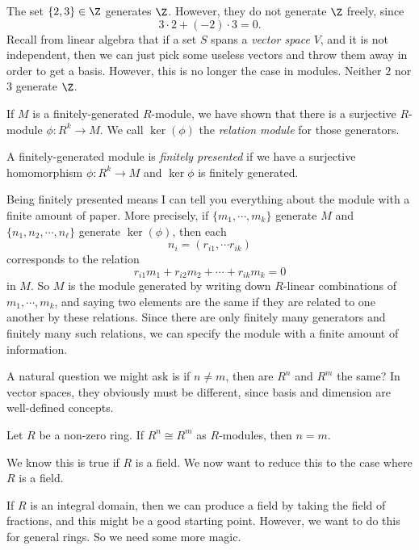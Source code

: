 \documentclass[a4paper]{article}
\begin{document}
\begin{eg}
  The set $\{2, 3\} \in \Z$ generates $\Z$. However, they do not generate $\Z$ freely, since
  \[
    3\cdot 2 + (-2) \cdot 3 = 0.
  \]
  Recall from linear algebra that if a set $S$ spans a \emph{vector space} $V$, and it is not independent, then we can just pick some useless vectors and throw them away in order to get a basis. However, this is no longer the case in modules. Neither $2$ nor $3$ generate $\Z$.
\end{eg}

\begin{defi}[Relations]
  If $M$ is a finitely-generated $R$-module, we have shown that there is a surjective $R$-module $\phi: R^k \to M$. We call $\ker(\phi)$ the \emph{relation module} for those generators.
\end{defi}

\begin{defi}
  A finitely-generated module is \emph{finitely presented} if we have a surjective homomorphism $\phi: R^k \to M$ and $\ker \phi$ is finitely generated.
\end{defi}

Being finitely presented means I can tell you everything about the module with a finite amount of paper. More precisely, if $\{m_1, \cdots, m_k\}$ generate $M$ and $\{n_1, n_2, \cdots, n_\ell\}$ generate $\ker(\phi)$, then each
\[
  n_i = (r_{i1}, \cdots r_{ik})
\]
corresponds to the relation
\[
  r_{i1}m_1 + r_{i2}m_2 + \cdots + r_{ik}m_k = 0
\]
in $M$. So $M$ is the module generated by writing down $R$-linear combinations of $m_1, \cdots, m_k$, and saying two elements are the same if they are related to one another by these relations. Since there are only finitely many generators and finitely many such relations, we can specify the module with a finite amount of information.

A natural question we might ask is if $n \not= m$, then are $R^n$ and $R^m$ the same? In vector spaces, they obviously must be different, since basis and dimension are well-defined concepts.

\begin{prop}
  Let $R$ be a non-zero ring. If $R^n \cong R^m$ as $R$-modules, then $n = m$.
\end{prop}
We know this is true if $R$ is a field. We now want to reduce this to the case where $R$ is a field.

If $R$ is an integral domain, then we can produce a field by taking the field of fractions, and this might be a good starting point. However, we want to do this for general rings. So we need some more magic.
\end{document}
